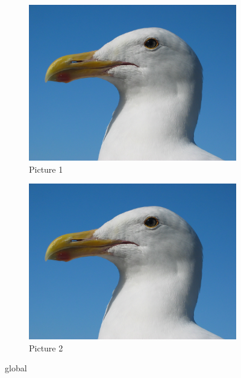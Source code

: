 \begin{figure}
	\centering
	
  	\begin{subfigure}[b]{0.4\textwidth}
    		\includegraphics[width=\textwidth]{images/gull}
    		\caption{Picture 1}
    		\label{fig:1}
  	\end{subfigure}
  	\begin{subfigure}[b]{0.4\textwidth}
    		\includegraphics[width=\textwidth]{images/gull}
    		\caption{Picture 2}
    		\label{fig:2}
  	\end{subfigure}
	
	\caption{global}
\end{figure}










